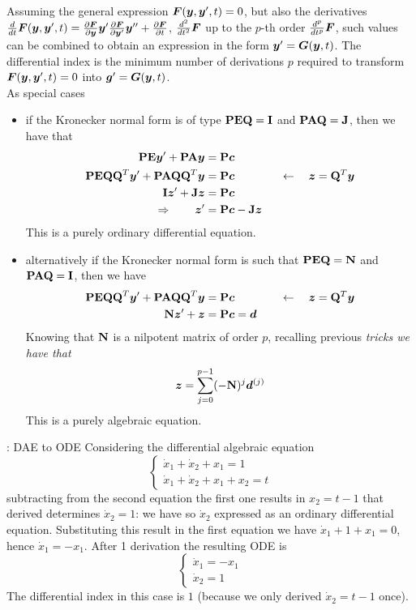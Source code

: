 	Assuming the general expression $\boldsymbol{F}(\boldsymbol{y}, \boldsymbol{y}', t) = 0$, but also the derivatives $\frac d{dt}\boldsymbol{F}(\boldsymbol{y},\boldsymbol{y}',t) = \frac{\partial \boldsymbol{F}}{\partial \boldsymbol{y}}\boldsymbol{y}' \frac{\partial \boldsymbol{F}}{\partial \boldsymbol{y}'} \boldsymbol{y}'' + \frac{\partial \boldsymbol{F}}{\partial t}$, $\frac{d^2}{dt^2}\boldsymbol{F}$ up to the $p$-th order $\frac{d^p}{dt^p}\boldsymbol{F}$, such values can be combined to obtain an expression in the form $\boldsymbol{y}' = \boldsymbol{G}(\boldsymbol{y},t)$. The differential index is the minimum number of derivations $p$ required to transform $\boldsymbol{F}(\boldsymbol{y},\boldsymbol{y}',t)= 0$ into $\boldsymbol{g}' = \boldsymbol{G}(\boldsymbol{y},t)$.\\
	As special cases
	\begin{itemize}
		\item if the Kronecker normal form is  of type $\mathbf{PEQ} = \mathbf{I}$ and $\mathbf{PAQ} = \mathbf{J}$, then we have that
		\begin{align*}
			\mathbf{PE }\boldsymbol{y}' + \mathbf{PA} \boldsymbol{y} & =  \mathbf{P} \boldsymbol{c} \\
			\mathbf{PEQQ}^T \boldsymbol{y}' + \mathbf{PAQQ}^T \boldsymbol{y} & = \mathbf{P} \boldsymbol{c} \hspace{1.4cm} \leftarrow \quad \boldsymbol{z} = \mathbf{Q}^T \boldsymbol{y} \\
			\mathbf{I} \boldsymbol{z}' + \mathbf{J} \boldsymbol{z} & = \mathbf{P} \boldsymbol{c} \\ \Rightarrow \qquad \boldsymbol{z}' & = \mathbf{P} \boldsymbol{c} - \mathbf{J} \boldsymbol{z}
		\end{align*}
		This is a purely ordinary differential equation.
		\item alternatively if the Kronecker normal form is such that $\mathbf{PEQ} = \mathbf{N}$ and $\mathbf{PAQ} = \mathbf{I}$, then we have
		\begin{align*}
			\mathbf{PEQQ}^T \boldsymbol{y}' + \mathbf{PAQQ}^T \boldsymbol{y} & = \mathbf{P} \boldsymbol{c} \hspace{1.4cm} \leftarrow \quad \boldsymbol{z} = \mathbf{Q}^T \boldsymbol{y} \\
			\mathbf{N} \boldsymbol{z}' + \boldsymbol{z} & = \mathbf{P} \boldsymbol{c} = \boldsymbol{d} 
		\end{align*}
		Knowing that $\mathbf{N}$ is a nilpotent matrix of order $p$, recalling previous \textit{tricks we have that}
		\[ \boldsymbol{z} = \sum_{j=0}^{p-1} (-\mathbf{N})^j \boldsymbol{d}^{(j)}  \]
		This is a purely algebraic equation.
	\end{itemize}
	
	\begin{example}{: DAE to ODE}
		Considering the differential algebraic equation
		\[ \begin{cases}
			\dot x_1 + \dot x_2 + x_1 = 1 \\
			\dot x_1 + \dot x_2 + x_1 + x_2 = t
		\end{cases} \]
		subtracting from the second equation the first one results in $x_2 = t-1$ that derived determines $\dot x_2 = 1$: we have so $\dot x_2$ expressed as an ordinary differential equation. Substituting this result in the first equation we have $\dot x_1 + 1 + x_1 = 0$, hence $\dot x_1 = -x_1$. After 1 derivation the resulting ODE is
		\[ \begin{cases}
			\dot x_1 = -x_1 \\ \dot x_2 = 1
		\end{cases} \]
		The differential index in this case is $1$ (because we only derived $\dot x_2 = t-1$ once).
	\end{example}
	
